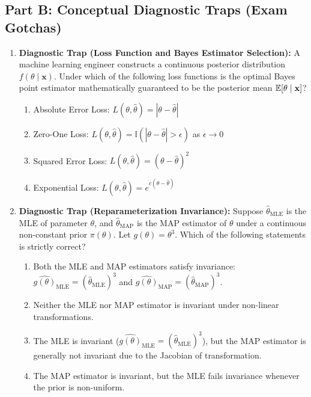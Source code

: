 \subsection*{Part B: Conceptual Diagnostic Traps (Exam Gotchas)}

\begin{enumerate}[resume]
\item \textbf{Diagnostic Trap (Loss Function and Bayes Estimator Selection):}
A machine learning engineer constructs a continuous posterior distribution $f(\theta \mid \mathbf{x})$. Under which of the following loss functions is the optimal Bayes point estimator mathematically guaranteed to be the posterior mean $\mathbb{E}[\theta \mid \mathbf{x}]$?
\begin{enumerate}
    \item Absolute Error Loss: $L(\theta, \hat{\theta}) = |\theta - \hat{\theta}|$
    \item Zero-One Loss: $L(\theta, \hat{\theta}) = \mathbb{I}(|\theta - \hat{\theta}| > \epsilon)$ as $\epsilon \to 0$
    \item Squared Error Loss: $L(\theta, \hat{\theta}) = (\theta - \hat{\theta})^2$
    \item Exponential Loss: $L(\theta, \hat{\theta}) = e^{c(\theta - \hat{\theta})}$
\end{enumerate}

\item \textbf{Diagnostic Trap (Reparameterization Invariance):}
Suppose $\hat{\theta}_{\text{MLE}}$ is the MLE of parameter $\theta$, and $\hat{\theta}_{\text{MAP}}$ is the MAP estimator of $\theta$ under a continuous non-constant prior $\pi(\theta)$. Let $g(\theta) = \theta^3$. Which of the following statements is strictly correct?
\begin{enumerate}
    \item Both the MLE and MAP estimators satisfy invariance: $\widehat{g(\theta)}_{\text{MLE}} = (\hat{\theta}_{\text{MLE}})^3$ and $\widehat{g(\theta)}_{\text{MAP}} = (\hat{\theta}_{\text{MAP}})^3$.
    \item Neither the MLE nor MAP estimator is invariant under non-linear transformations.
    \item The MLE is invariant ($\widehat{g(\theta)}_{\text{MLE}} = (\hat{\theta}_{\text{MLE}})^3$), but the MAP estimator is generally not invariant due to the Jacobian of transformation.
    \item The MAP estimator is invariant, but the MLE fails invariance whenever the prior is non-uniform.
\end{enumerate}
\end{enumerate}
